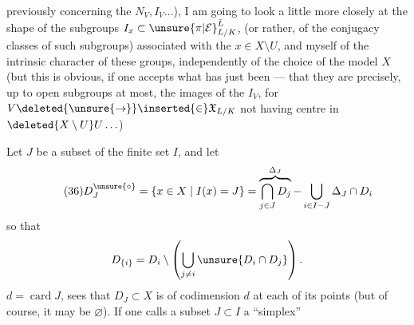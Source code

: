 
previously concerning the $N_V,I_V\ldots$), I am going to look a little more closely at the shape of the subgroups $I_x\subset\unsure{\pi|\mathcal E}_{L/K}^{\bar L}$, (or  rather, of the \inserted{$\pi$-}conjugacy classes of such subgroups) associated with the $x\in X\setminus U$,  and  myself of the intrinsic character of these groups, independently of the choice of the model $X$ (but this is obvious, if one accepts what has just been  --- that they are precisely, up to open subgroups at  most, the images of the $I_V$, for $V\deleted{\unsure{\to}}\inserted{\in}\mathfrak X_{L/K}$ not having  centre in $\deleted{X\setminus U}U\ldots$)


Let $J$ be a subset of the finite set $I$, and let
\[
\tag{36}
D_J^{\unsure{\circ}}=\{x\in X\mid I(x)=J\}
=\overbrace{\bigcap_{j\in J}D_j}^{\Delta_J}-\bigcup_{i\in I-J}\Delta_J\cap D_i
\]
so that
\[
D_{\{i\}}=D_i\setminus\left(\bigcup_{j\ne i}\unsure{D_i\cap D_j}\right).
\]
 $d=\operatorname{card}J$,  sees that $D_J\subset X$ is  of codimension $d$ at each of its points (but of course, it may be $\varnothing$). If one calls a subset $J\subset I$ a ``simplex''


